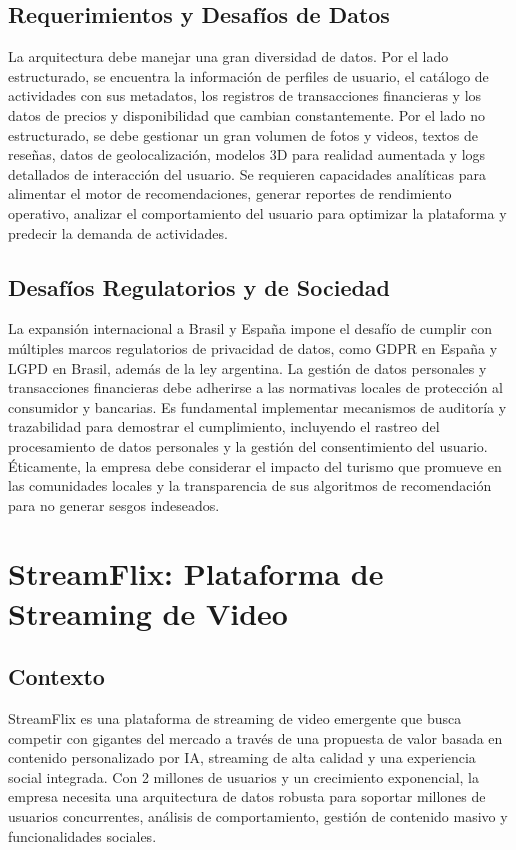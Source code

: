 \documentclass[12pt]{article}
\begin{document}
\subsection{Requerimientos y Desafíos de Datos}
La arquitectura debe manejar una gran diversidad de datos. Por el lado estructurado, se encuentra la información de perfiles de usuario, el catálogo de actividades con sus metadatos, los registros de transacciones financieras y los datos de precios y disponibilidad que cambian constantemente. Por el lado no estructurado, se debe gestionar un gran volumen de fotos y videos, textos de reseñas, datos de geolocalización, modelos 3D para realidad aumentada y logs detallados de interacción del usuario. Se requieren capacidades analíticas para alimentar el motor de recomendaciones, generar reportes de rendimiento operativo, analizar el comportamiento del usuario para optimizar la plataforma y predecir la demanda de actividades.

\subsection{Desafíos Regulatorios y de Sociedad}
La expansión internacional a Brasil y España impone el desafío de cumplir con múltiples marcos regulatorios de privacidad de datos, como GDPR en España y LGPD en Brasil, además de la ley argentina. La gestión de datos personales y transacciones financieras debe adherirse a las normativas locales de protección al consumidor y bancarias. Es fundamental implementar mecanismos de auditoría y trazabilidad para demostrar el cumplimiento, incluyendo el rastreo del procesamiento de datos personales y la gestión del consentimiento del usuario. Éticamente, la empresa debe considerar el impacto del turismo que promueve en las comunidades locales y la transparencia de sus algoritmos de recomendación para no generar sesgos indeseados.

\newpage

\section{StreamFlix: Plataforma de Streaming de Video}

\subsection{Contexto}
StreamFlix es una plataforma de streaming de video emergente que busca competir con gigantes del mercado a través de una propuesta de valor basada en contenido personalizado por IA, streaming de alta calidad y una experiencia social integrada. Con 2 millones de usuarios y un crecimiento exponencial, la empresa necesita una arquitectura de datos robusta para soportar millones de usuarios concurrentes, análisis de comportamiento, gestión de contenido masivo y funcionalidades sociales.
\end{document}

